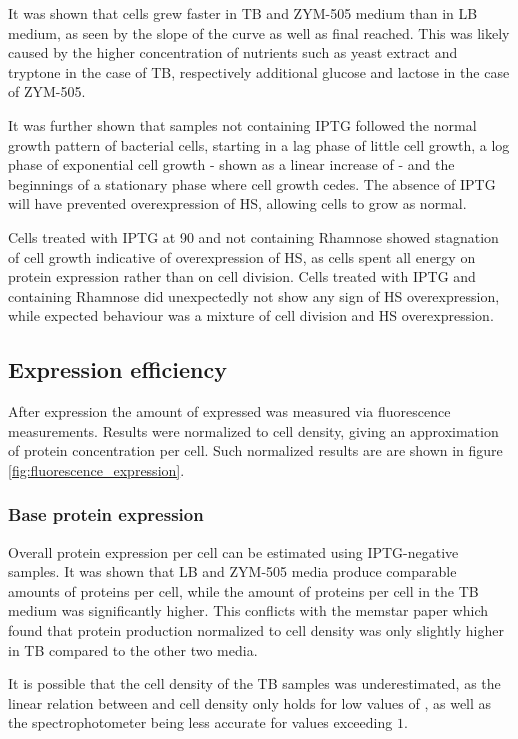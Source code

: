 It was shown that cells grew faster in TB and ZYM-505 medium than in LB medium,
as seen by the slope of the curve as well as final \odbact{} reached. This was
likely caused by the higher concentration of nutrients such as yeast extract
and tryptone in the case of TB, respectively additional glucose and lactose in
the case of ZYM-505.

It was further shown that samples not containing IPTG followed the normal
growth pattern of bacterial cells, starting in a lag phase of little cell
growth, a log phase of exponential cell growth - shown as a linear increase of
\odbact - and the beginnings of a stationary phase where cell growth cedes. The
absence of IPTG will have prevented overexpression of HS, allowing cells to
grow as normal.

Cells treated with IPTG at \SI{90}{\min} and not containing Rhamnose showed
stagnation of cell growth indicative of overexpression of HS, as cells spent
all energy on protein expression rather than on cell division. Cells treated
with IPTG and containing Rhamnose did unexpectedly not show any sign of HS
overexpression, while expected behaviour was a mixture of cell division and HS
overexpression.

\subsection{Expression efficiency}

After expression the amount of expressed \hsdsred{} was measured via fluorescence
measurements. Results were normalized to cell density, giving an approximation
of protein concentration per cell. Such normalized results are are shown in
figure \ref{fig:fluorescence_expression}.

\subsubsection{Base protein expression}

Overall protein expression per cell can be estimated using IPTG-negative
samples. It was shown that LB and ZYM-505 media produce comparable amounts of
proteins per cell, while the amount of proteins per cell in the TB medium was
significantly higher. This conflicts with the memstar paper which found that
protein production normalized to cell density was only slightly higher in TB
compared to the other two media. \cite{memstar}

It is possible that the cell density of the TB samples was underestimated, as
the linear relation between \odbact{} and cell density only holds for low values
of \odbact{}, as well as the spectrophotometer being less accurate for values
exceeding $1$.

